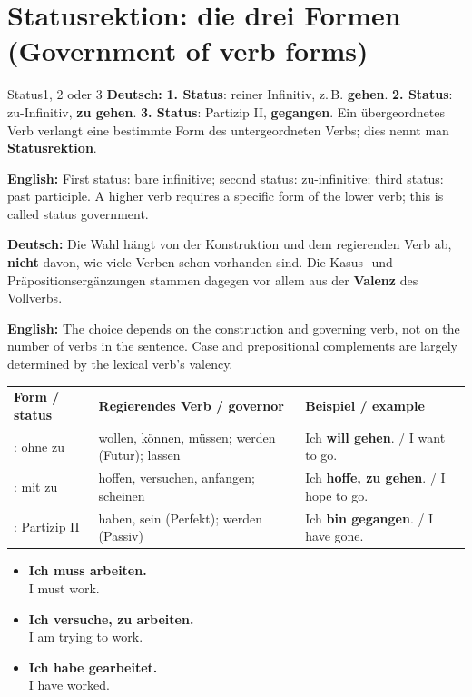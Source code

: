 \documentclass[a4paper,11pt]{article}
\newcommand{\GermanText}[1]{\textbf{Deutsch: }#1\par}
\newcommand{\EnglishText}[1]{{\small\color{SoftGray}\textbf{English: }#1\par}}
\newcommand{\ExampleItem}[2]{\item \textbf{#1}\\{\small\color{SoftGray}#2}}
\newcommand{\DEEN}[2]{\GermanText{#1}\EnglishText{#2}}
\newcommand{\Pair}[2]{\ExampleItem{#1}{#2}}
\begin{document}
\section{Statusrektion: die drei Formen \textnormal{(Government of verb forms)}}
\begin{grammarentry}{Status}{1, 2 oder 3}
\DEEN{\textbf{1. Status}: reiner Infinitiv, z.\,B. \textbf{gehen}. \textbf{2. Status}: zu-Infinitiv, \textbf{zu gehen}. \textbf{3. Status}: Partizip II, \textbf{gegangen}. Ein übergeordnetes Verb verlangt eine bestimmte Form des untergeordneten Verbs; dies nennt man \textbf{Statusrektion}.}{First status: bare infinitive; second status: zu-infinitive; third status: past participle. A higher verb requires a specific form of the lower verb; this is called status government.}
\DEEN{Die Wahl hängt von der Konstruktion und dem regierenden Verb ab, \textbf{nicht} davon, wie viele Verben schon vorhanden sind. Die Kasus- und Präpositionsergänzungen stammen dagegen vor allem aus der \textbf{Valenz} des Vollverbs.}{The choice depends on the construction and governing verb, not on the number of verbs in the sentence. Case and prepositional complements are largely determined by the lexical verb's valency.}
\end{grammarentry}
\begin{longtable}{>{\raggedright\arraybackslash}p{2.5cm} >{\raggedright\arraybackslash}p{4.7cm} >{\raggedright\arraybackslash}p{5.9cm}}
\rowcolor{HeaderBlueDark}\color{white}\textbf{Form / status}&\color{white}\textbf{Regierendes Verb / governor}&\color{white}\textbf{Beispiel / example}\\
1: ohne zu & wollen, können, müssen; werden (Futur); lassen & Ich \textbf{will gehen}. / I want to go.\\
2: mit zu & hoffen, versuchen, anfangen; scheinen & Ich \textbf{hoffe, zu gehen}. / I hope to go.\\
3: Partizip II & haben, sein (Perfekt); werden (Passiv) & Ich \textbf{bin gegangen}. / I have gone.\\
\end{longtable}
\begin{exbox}\begin{itemize}
\Pair{Ich muss arbeiten.}{I must work.}
\Pair{Ich versuche, zu arbeiten.}{I am trying to work.}
\Pair{Ich habe gearbeitet.}{I have worked.}
\end{itemize}\end{exbox}
\end{document}
